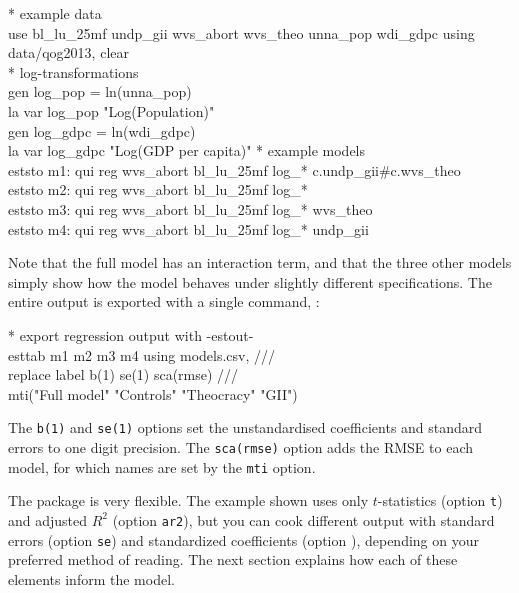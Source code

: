 \begin{docspec}
  * example data\\%
  use bl\_lu\_25mf undp\_gii wvs\_abort wvs\_theo unna\_pop wdi\_gdpc using data/qog2013, clear\\%
  * log-transformations\\%
  gen log\_pop = ln(unna\_pop)\\%
  la var log\_pop "Log(Population)"\\%
  gen log\_gdpc = ln(wdi\_gdpc)\\%
  la var log\_gdpc "Log(GDP per capita)"
  * example models\\%
  eststo m1: qui reg wvs\_abort bl\_lu\_25mf log\_* c.undp\_gii\#c.wvs\_theo\\%
  eststo m2: qui reg wvs\_abort bl\_lu\_25mf log\_*\\%
  eststo m3: qui reg wvs\_abort bl\_lu\_25mf log\_* wvs\_theo\\%
  eststo m4: qui reg wvs\_abort bl\_lu\_25mf log\_* undp\_gii
\end{docspec}

Note that the full model has an interaction term, and that the three other models simply show how the model behaves under slightly different specifications. The entire output is exported with a single command, :

\begin{docspec}
  * export regression output with -estout-\\%
  esttab m1 m2 m3 m4 using models.csv, ///\\%
    replace label b(1) se(1) sca(rmse) ///\\%
  	mti("Full model" "Controls" "Theocracy" "GII")
\end{docspec}

The \texttt{b(1)} and \texttt{se(1)} options set the unstandardised coefficients and standard errors to one digit precision. The \texttt{sca(rmse)} option adds the RMSE to each model, for which names are set by the \texttt{mti} option.

The  package is very flexible. The example shown uses only $t$-statistics (option \texttt{t}) and adjusted $R^2$ (option \texttt{ar2}), but you can cook different output with standard errors (option \texttt{se}) and standardized coefficients (option ), depending on your preferred method of reading. The next section explains how each of these elements inform the model.

